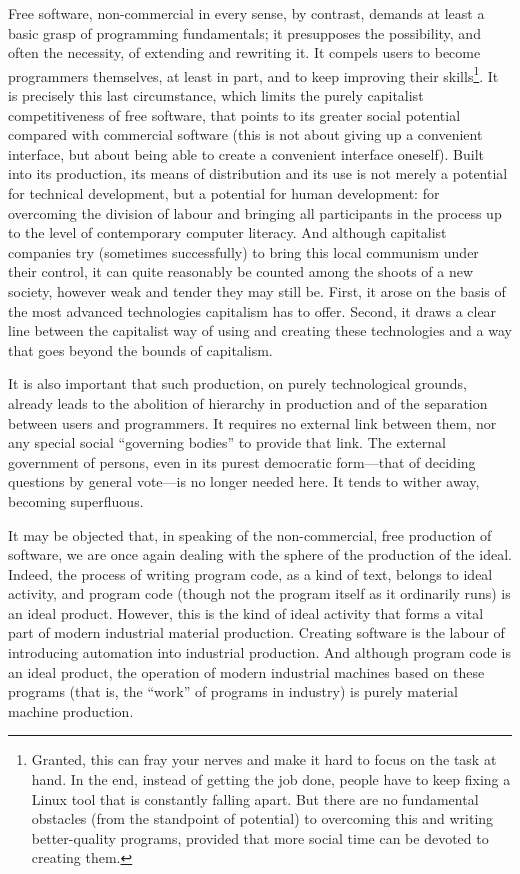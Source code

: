 \documentclass[12pt,a4paper,openany]{book}
\begin{document}
Free software, non-commercial in every sense, by contrast, demands at least a basic grasp of programming fundamentals; it presupposes the possibility, and often the necessity, of extending and rewriting it. It compels users to become programmers themselves, at least in part, and to keep improving their skills\footnote{Granted, this can fray your nerves and make it hard to focus on the task at hand. In the end, instead of getting the job done, people have to keep fixing a Linux tool that is constantly falling apart. But there are no fundamental obstacles (from the standpoint of potential) to overcoming this and writing better-quality programs, provided that more social time can be devoted to creating them.}. It is precisely this last circumstance, which limits the purely capitalist competitiveness of free software, that points to its greater social potential compared with commercial software (this is not about giving up a convenient interface, but about being able to create a convenient interface oneself). Built into its production, its means of distribution and its use is not merely a potential for technical development, but a potential for human development: for overcoming the division of labour and bringing all participants in the process up to the level of contemporary computer literacy. And although capitalist companies try (sometimes successfully) to bring this local communism under their control, it can quite reasonably be counted among the shoots of a new society, however weak and tender they may still be. First, it arose on the basis of the most advanced technologies capitalism has to offer. Second, it draws a clear line between the capitalist way of using and creating these technologies and a way that goes beyond the bounds of capitalism.

It is also important that such production, on purely technological grounds, already leads to the abolition of hierarchy in production and of the separation between users and programmers. It requires no external link between them, nor any special social “governing bodies” to provide that link. The external government of persons, even in its purest democratic form—that of deciding questions by general vote—is no longer needed here. It tends to wither away, becoming superfluous.

It may be objected that, in speaking of the non-commercial, free production of software, we are once again dealing with the sphere of the production of the ideal. Indeed, the process of writing program code, as a kind of text, belongs to ideal activity, and program code (though not the program itself as it ordinarily runs) is an ideal product. However, this is the kind of ideal activity that forms a vital part of modern industrial material production. Creating software is the labour of introducing automation into industrial production. And although program code is an ideal product, the operation of modern industrial machines based on these programs (that is, the “work” of programs in industry) is purely material machine production.
\end{document}
